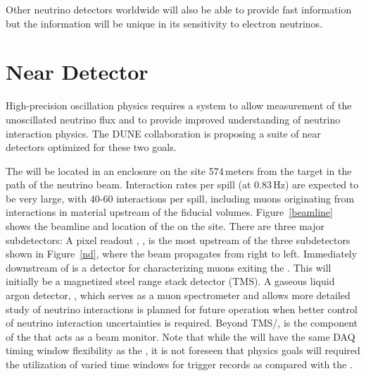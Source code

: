 \documentclass[../main-v1.tex]{subfiles}
\begin{document}
Other neutrino detectors worldwide will also be able to provide fast information but the  information will be unique in its sensitivity to electron neutrinos. 







\section{Near Detector }

High-precision oscillation physics requires a  system to allow measurement of the unoscillated neutrino flux and %
to provide improved understanding of neutrino interaction physics. 
The DUNE  collaboration is proposing a suite of near detectors optimized for these two goals. 
 
 The   will be located in an enclosure on the  site 574\,meters from the target %
 in the path of the neutrino beam.    Interaction rates per spill (at 0.83\,Hz) are expected to be very large, with 40-60 interactions per spill, including muons originating from interactions in material upstream of the fiducial volumes. Figure~\ref{beamline} shows the beamline and location of the  on the  site. There are three major subdetectors:
 A pixel readout %
 , , is  the most upstream of the three subdetectors shown in Figure~\ref{nd}, where the beam propagates  from right to left. Immediately downstream of  is a detector for characterizing muons exiting the . This will initially be a magnetized steel range stack detector (TMS). A gaseous liquid argon detector, , which serves %
 as  a muon spectrometer and allows more detailed study of neutrino interactions is planned for future operation when better control of neutrino interaction uncertainties is required. %
 Beyond TMS/, is the  component of the  that acts as a beam monitor. %
Note that while the  will have the same DAQ timing window flexibility as the , it is not foreseen that  physics goals will required the utilization of varied time windows for trigger records as compared with the . %
\end{document}

